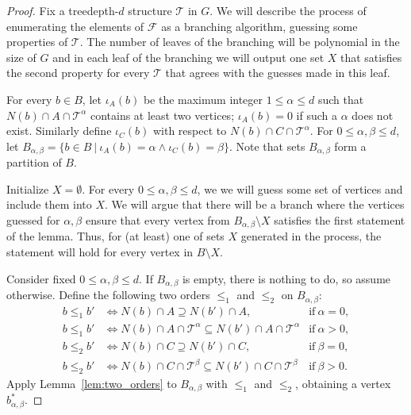 \documentclass[11pt,a4paper]{article}
\theoremstyle{definition}
\def\T{\mathcal{T}}
\begin{document}
\begin{proof}
    Fix a treedepth-$d$ structure $\T$ in $G$. We will describe the process of enumerating
    the elements of $\mathcal{F}$ as a branching algorithm, guessing some properties of $\T$.
    The number of leaves of the branching will be polynomial in the size of $G$
    and in each leaf of the branching we will output one set $X$ that satisfies the second
    property for every $\T$ that agrees with the guesses made in this leaf.

    For every $b \in B$, let $\iota_A(b)$ be the maximum integer $1 \leq \alpha \leq d$
    such that $N(b) \cap A \cap \T^\alpha$ contains at least two vertices;
    $\iota_A(b) = 0$ if such a $\alpha$  does not exist.
    Similarly define $\iota_C(b)$ with respect to $N(b) \cap C \cap \T^\alpha$.
    For $0 \leq \alpha,\beta \leq d$, let $B_{\alpha,\beta} = \{b \in B~|~\iota_A(b) = \alpha \wedge \iota_C(b) = \beta\}$. 
    Note that sets $B_{\alpha,\beta}$ form a partition of $B$.

    Initialize $X = \emptyset$.   
    For every $0 \leq \alpha,\beta \leq d$, we we will guess some set of vertices and include them into $X$.
    We will argue that there will be a branch where the vertices guessed for $\alpha,\beta$ ensure that every vertex from $B_{\alpha,\beta} \setminus X$ satisfies the first statement of the lemma. Thus, for (at least) one of sets $X$ generated in the process, the statement will hold for every vertex in $B \setminus X$.
         
    Consider fixed $0 \leq \alpha,\beta \leq d$. 
    If $B_{\alpha,\beta}$ is empty, there is nothing to do, so assume otherwise.
    Define the following two orders $\leq_1$ and $\leq_2$ on $B_{\alpha,\beta}$:
    \begin{align*}
      b \leq_1 b' &\Longleftrightarrow N(b) \cap A \supseteq N(b') \cap A,  & \mathrm{if}\ \alpha=0, \\
      b \leq_1 b' &\Longleftrightarrow N(b) \cap A \cap \T^\alpha \subseteq N(b') \cap A \cap \T^\alpha &\mathrm{if}\ \alpha > 0, \\
      b \leq_2 b' &\Longleftrightarrow N(b) \cap C \supseteq N(b') \cap C,  & \mathrm{if}\ \beta=0, \\
      b \leq_2 b' &\Longleftrightarrow N(b) \cap C \cap \T^\beta \subseteq N(b') \cap C \cap \T^\beta &\mathrm{if}\ \beta > 0.
    \end{align*}
    Apply Lemma~\ref{lem:two_orders} to $B_{\alpha,\beta}$ with $\leq_1$ and $\leq_2$, 
    obtaining a vertex $b_{\alpha,\beta}^\ast$.
    

\end{proof}
\end{document}

